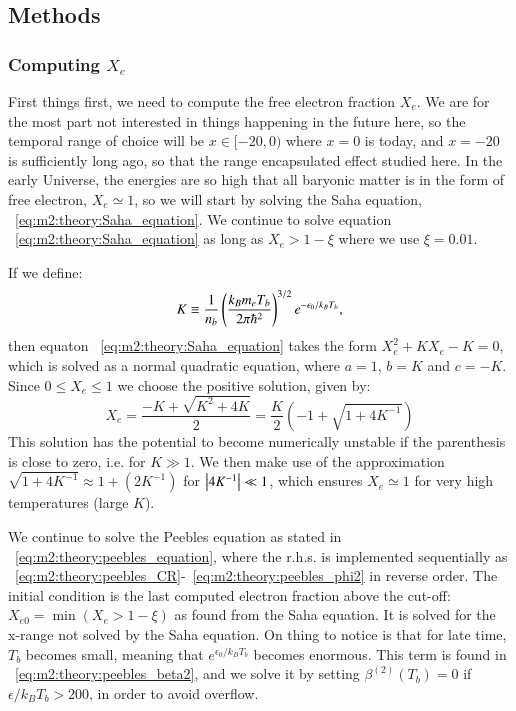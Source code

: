 \subsection{Methods}\label{sec:m2:methods}

\subsubsection{Computing $X_e$}\label{sec:m2:methods:electron_fraction}
    First things first, we need to compute the free electron fraction $X_e$. We are for the most part not interested in things happening in the future here, so the temporal range of choice will be $x\in[-20,0)$ where $x=0$ is today, and $x=-20$ is sufficiently long ago, so that the range encapsulated effect studied here. In the early Universe, the energies are so high that all baryonic matter is in the form of free electron, $X_e\simeq1$, so we will start by solving the Saha equation, ~\cref{eq:m2:theory:Saha_equation}. We continue to solve equation ~\cref{eq:m2:theory:Saha_equation} as long as $X_e>1-\xi$ where we use $\xi=0.01$.

    If we define:
    \begin{equation}
        K \equiv \frac{1}{n_b}\left(\frac{k_Bm_eT_b}{2\pi\hbar^2}\right)^{3/2}e^{-\epsilon_0/k_BT_b},
    \end{equation}
    then equaton ~\cref{eq:m2:theory:Saha_equation} takes the form $X_e^2 + KX_e - K = 0$, which is solved as a normal quadratic equation, where $a=1$, $b=K$ and $c=-K$. Since $0\leq X_e\leq1$ we choose the positive solution, given by:
    \begin{equation}\label{eq:m2:methods:sqrt_approx}
        X_e = \frac{-K+\sqrt{K^2+4K}}{2} = \frac{K}{2}\left(-1+\sqrt{1+4K^{-1}}\right)
    \end{equation}
    This solution has the potential to become numerically unstable if the parenthesis is close to zero, i.e. for $K\gg1$. We then make use of the approximation $\sqrt{1+4K^{-1}} \approx 1+(2K^{-1})$ for $\abs{4K^{-1}}\ll1$, which ensures $X_e\simeq1$ for very high temperatures (large $K$).


    We continue to solve the Peebles equation as stated in ~\cref{eq:m2:theory:peebles_equation}, where the r.h.s. is implemented sequentially as ~\cref{eq:m2:theory:peebles_CR}-~\cref{eq:m2:theory:peebles_phi2} in reverse order. The initial condition is the last computed electron fraction above the cut-off: $X_{e0}=\min(X_e>1-\xi)$ as found from the Saha equation. It is solved for the x-range not solved by the Saha equation. On thing to notice is that for late time, $T_b$ becomes small, meaning that $e^{\epsilon_0/k_BT_b}$ becomes enormous. This term is found in ~\cref{eq:m2:theory:peebles_beta2}, and we solve it by setting $\beta^{(2)}(T_b)=0$ if $\epsilon/k_BT_b > 200$, in order to avoid overflow. 

